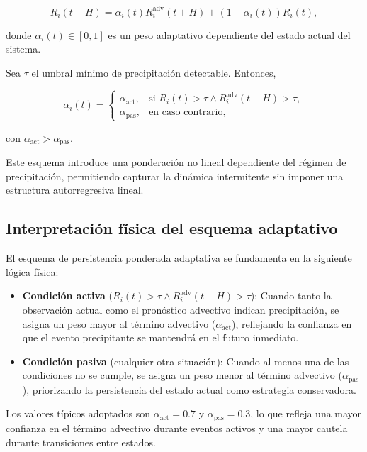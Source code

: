 \documentclass[
  spanish,
  us-letterpaper,
]{scrreprt}
\numberwithin{equation}{section}
\begin{document}
\[
R_i(t+H) = \alpha_i(t) R_i^{\text{adv}}(t+H) + (1-\alpha_i(t)) R_i(t),
\]

donde \(\alpha_i(t) \in [0,1]\) es un peso adaptativo dependiente del
estado actual del sistema.

Sea \(\tau\) el umbral mínimo de precipitación detectable. Entonces,

\[
\alpha_i(t) =
\begin{cases}
\alpha_{\text{act}}, & \text{si } R_i(t) > \tau \land R_i^{\text{adv}}(t+H) > \tau, \\
\alpha_{\text{pas}}, & \text{en caso contrario},
\end{cases}
\]

con \(\alpha_{\text{act}} > \alpha_{\text{pas}}\).

Este esquema introduce una ponderación no lineal dependiente del régimen
de precipitación, permitiendo capturar la dinámica intermitente sin
imponer una estructura autorregresiva lineal.

\subsection{Interpretación física del esquema
adaptativo}\label{interpretaciuxf3n-fuxedsica-del-esquema-adaptativo}

El esquema de persistencia ponderada adaptativa se fundamenta en la
siguiente lógica física:

\begin{itemize}
\item
  \textbf{Condición activa}
  (\(R_i(t) > \tau \land R_i^{\text{adv}}(t+H) > \tau\)): Cuando tanto
  la observación actual como el pronóstico advectivo indican
  precipitación, se asigna un peso mayor al término advectivo
  (\(\alpha_{\text{act}}\)), reflejando la confianza en que el evento
  precipitante se mantendrá en el futuro inmediato.
\item
  \textbf{Condición pasiva} (cualquier otra situación): Cuando al menos
  una de las condiciones no se cumple, se asigna un peso menor al
  término advectivo (\(\alpha_{\text{pas}}\)), priorizando la
  persistencia del estado actual como estrategia conservadora.
\end{itemize}

Los valores típicos adoptados son \(\alpha_{\text{act}} = 0.7\) y
\(\alpha_{\text{pas}} = 0.3\), lo que refleja una mayor confianza en el
término advectivo durante eventos activos y una mayor cautela durante
transiciones entre estados.
\end{document}
